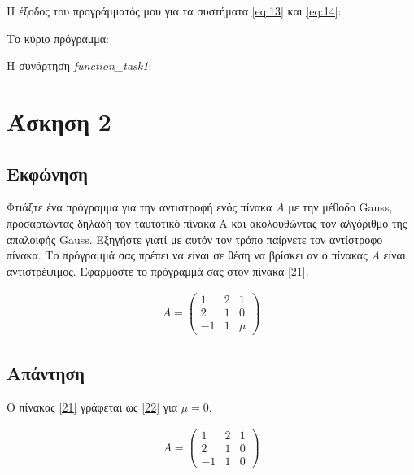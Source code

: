 \documentclass[14pt]{extreport}
\begin{document}
Η έξοδος του προγράμματός μου για τα συστήματα \eqref{eq:13} και \eqref{eq:14}:

\newpage
Το κύριο πρόγραμμα:


\newpage
Η συνάρτηση \textit{function\_task1}:


\chapter{Άσκηση 2}
\section{Εκφώνηση}

Φτιάξτε ένα πρόγραμμα για την αντιστροφή ενός πίνακα $A$ με την μέθοδο Gauss, προσαρτώντας δηλαδή τον ταυτοτικό πίνακα Α και ακολουθώντας τον αλγόριθμο της απαλοιφής Gauss. Εξηγήστε γιατί με αυτόν τον τρόπο παίρνετε τον αντίστροφο πίνακα. Το πρόγραμμά σας πρέπει να είναι σε θέση να βρίσκει αν ο πίνακας $A$ είναι αντιστρέψιμος. Εφαρμόστε το πρόγραμμά σας στον πίνακα \eqref{21}.

\begin{equation}
    \begin{aligned}
        A = \begin{pmatrix}
            1  & 2 & 1   \\
            2  & 1 & 0   \\
            -1 & 1 & \mu
        \end{pmatrix}\label{21}
    \end{aligned}
\end{equation}


\newpage
\section{Απάντηση}

Ο πίνακας \eqref{21} γράφεται ως \eqref{22} για $\mu = 0$.

\begin{equation}
    \begin{aligned}
        A = \begin{pmatrix}
            1  & 2 & 1 \\
            2  & 1 & 0 \\
            -1 & 1 & 0
        \end{pmatrix}\label{22}
    \end{aligned}
\end{equation}
\end{document}
